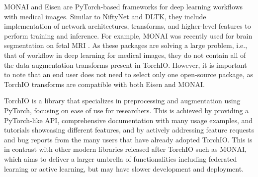 \ac{MONAI} \cite{nic_ma_project-monaimonai_2021} and Eisen \cite{mancolo_eisen_2020} are PyTorch-based frameworks for deep learning workflows with medical images.
Similar to NiftyNet and \ac{DLTK}, they include implementation of network architectures, transforms, and higher-level features to perform training and inference.
For example, \ac{MONAI} was recently used for brain segmentation on fetal \ac{MRI} \cite{ranzini_monaifbs_2021}.
As these packages are solving a large problem, i.e., that of workflow in deep learning for medical images, they do not contain all of the data augmentation transforms present in TorchIO.
However, it is important to note that an end user does not need to select only one open-source package, as TorchIO transforms are compatible with both Eisen and \ac{MONAI}.

TorchIO is a library that specializes in preprocessing and augmentation using PyTorch, focusing on ease of use for researchers.
This is achieved by providing a PyTorch-like \ac{API}, comprehensive documentation with many usage examples, and tutorials showcasing different features, and by actively addressing feature requests and bug reports from the many users that have already adopted TorchIO.
This is in contrast with other modern libraries released after TorchIO such as \ac{MONAI}, which aims to deliver a larger umbrella of functionalities including federated learning or active learning, but may have slower development and deployment.
